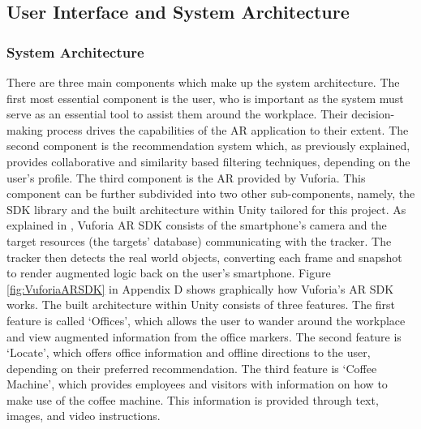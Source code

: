 \documentclass{aifyp}
\begin{document}
\subsection{User Interface and System Architecture}
\subsubsection{System Architecture}
There are three main components which make up the system architecture. The first most essential component is the user, who is important as the system must serve as an essential tool to assist them around the workplace. Their decision-making process drives the capabilities of the AR application to their extent. The second component is the recommendation system which, as previously explained, provides collaborative and similarity based filtering techniques, depending on the user’s profile. The third component is the AR provided by Vuforia. This component can be further subdivided into two other sub-components, namely, the SDK library and the built architecture within Unity tailored for this project.
\newline
\newline
As explained in \cite{Ibez2013VuforiaVS}, Vuforia AR SDK consists of the smartphone's camera and the target resources (the targets' database) communicating with the tracker. The tracker then detects the real world objects, converting each frame and snapshot to render augmented logic back on the user's smartphone. Figure \ref{fig:VuforiaARSDK} in Appendix D shows graphically how Vuforia's AR SDK works.
\newline
\newline
The built architecture within Unity consists of three features. The first feature is called ‘Offices’, which allows the user to wander around the workplace and view augmented information from the office markers. The second feature is ‘Locate’, which offers office information and offline directions to the user, depending on their preferred recommendation. The third feature is ‘Coffee Machine’, which provides employees and visitors with information on how to make use of the coffee machine. This information is provided through text, images, and video instructions.
\newline
\newline
\end{document}
